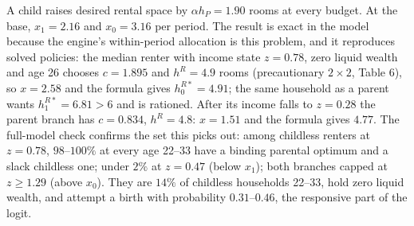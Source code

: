 \documentclass[10pt]{article}
\newcommand{\1}{\mathbf 1}
\begin{document}
A child raises desired rental space by $\alpha h_P=1.90$ rooms at every budget. At the base, $x_1=2.16$ and $x_0=3.16$ per period. The result is exact in the model because the engine's within-period allocation is this problem, and it reproduces solved policies: the median renter with income state $z=0.78$, zero liquid wealth and age 26 chooses $c=1.895$ and $h^{R}=4.9$ rooms (precautionary $2\times2$, Table 6), so $x=2.58$ and the formula gives $h^{R*}_0=4.91$; the same household as a parent wants $h^{R*}_1=6.81>6$ and is rationed. After its income falls to $z=0.28$ the parent branch has $c=0.834$, $h^{R}=4.8$: $x=1.51$ and the formula gives $4.77$. The full-model check confirms the set this picks out: among childless renters at $z=0.78$, $98$--$100\%$ at every age 22--33 have a binding parental optimum and a slack childless one; under $2\%$ at $z=0.47$ (below $x_1$); both branches capped at $z\ge1.29$ (above $x_0$). They are $14\%$ of childless households 22--33, hold zero liquid wealth, and attempt a birth with probability $0.31$--$0.46$, the responsive part of the logit.
\end{document}
